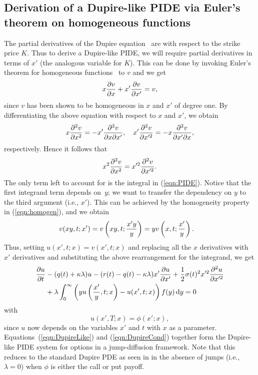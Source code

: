 \subsection{Derivation of a Dupire-like PIDE via Euler's theorem on homogeneous functions}
The partial derivatives of the Dupire equation~\cite{Gatheral2006} are with respect to the strike price $K$. Thus to derive a Dupire-like PIDE, we will require partial derivatives in terms of $x'$ (the analogous variable for $K$). This can be done by invoking Euler's theorem for homogeneous functions~\cite[pp. 317]{Kishan2007} to $v$ and we get
	\begin{equation*}
		x\frac{\partial v}{\partial x} + x'\frac{\partial v}{\partial x'} = v,
	\end{equation*}
since $v$ has been shown to be homogeneous in $x$ and $x'$ of degree one. By differentiating the above equation with respect to $x$ and $x'$, we obtain
	\begin{equation*}
		x\frac{\partial^2 v}{\partial x^2} = -x'\frac{\partial^2 v}{\partial x \partial x'}, \quad x'\frac{\partial^2 v}{\partial x'^2} = -x\frac{\partial^2 v}{\partial x' \partial x},
	\end{equation*}
respectively. Hence it follows that
	\begin{equation*}
		x^2\frac{\partial^2 v}{\partial x^2} = x'^2\frac{\partial^2 v}{\partial x'^2}.
	\end{equation*}
The only term left to account for is the integral in (\ref{eqn:PIDE}). Notice that the first integrand term depends on~$y$; we want to transfer the dependency on $y$ to the third argument (i.e., $x'$). This can be achieved by the homogeneity property in (\ref{eqn:homogen}), and we obtain
	\begin{align*}
		v(xy,t; x') &= v\left(xy,t;\frac{x'y}{y}\right) = yv\left( x,t;\frac{x'}{y} \right).
	\end{align*}
Thus, setting $u(x',t; x) = v(x',t; x)$ and replacing all the $x$ derivatives with $x'$ derivatives and substituting the above rearrangement for the integrand, we get
	\begin{align}
		\label{eqn:DupireLike}
		\begin{split}
		\frac{\partial u}{\partial t} &- (q(t) + \kappa\lambda)u - (r(t) - q(t) - \kappa\lambda)x'\frac{\partial u}{\partial x'} + \frac{1}{2}\sigma(t)^2x'^2\frac{\partial^2 u}{\partial x'^2} \\
		& {} + \lambda \int_0^\infty \left( yu\left( \frac{x'}{y},t; x \right) - u(x',t; x) \right)f(y) \, \mathrm d y = 0
		\end{split}
	\end{align}
with
	\begin{equation}
		\label{eqn:DupireCond}
		u(x',T; x) = \phi(x';x),
	\end{equation}
since $u$ now depends on the variables $x'$ and $t$ with $x$ as a parameter. Equations~(\ref{eqn:DupireLike}) and (\ref{eqn:DupireCond}) together form the Dupire-like PIDE system for options in a jump-diffusion framework. Note that this reduces to the standard Dupire PDE as seen in \cite{Gatheral2006} in the absence of jumps (i.e., $\lambda = 0$) when $\phi$ is either the call or put payoff.

